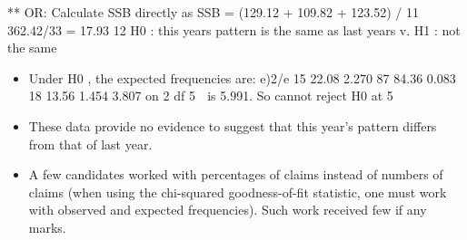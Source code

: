 \documentclass[a4paper,12pt]{article}
\begin{document}
** OR: Calculate SSB directly as
SSB = (129.12 + 109.82 + 123.52) / 11  362.42/33 = 17.93
12 H0 : this years pattern is the same as last years v. H1 : not the same
\begin{itemize}
    \item Under H0 , the expected frequencies are:
e)2/e
15 22.08 2.270
87 84.36 0.083
18 13.56 1.454
3.807 on 2 df
5%
 is 5.991. So cannot reject H0 at 5%
\item These data provide no evidence to suggest that this year’s pattern differs from
that of last year.
\item A few candidates worked with percentages of claims instead of numbers of claims
(when using the chi-squared goodness-of-fit statistic, one must work with observed
and expected frequencies). Such work received few if any marks.
\end{itemize}
\end{document}
